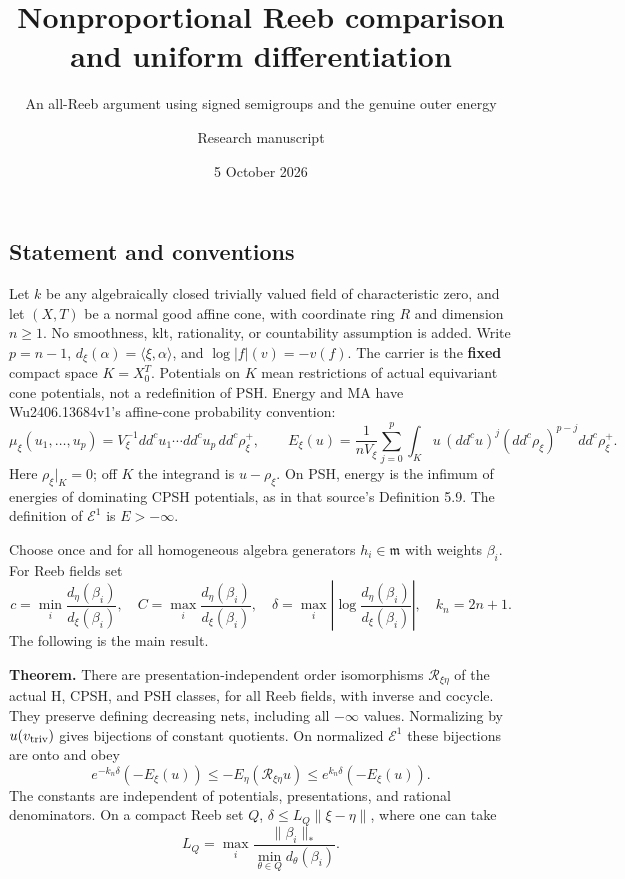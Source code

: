 \documentclass[
  10pt,
]{article}
\title{Nonproportional Reeb comparison and uniform differentiation}
\subtitle{An all-Reeb argument using signed semigroups and the genuine
outer energy}
\author{Research manuscript}
\date{5 October 2026}
\begin{document}
\maketitle

\subsection{Statement and conventions}\label{statement-and-conventions}

Let \(k\) be any algebraically closed trivially valued field of
characteristic zero, and let \((X,T)\) be a normal good affine cone,
with coordinate ring \(R\) and dimension \(n\geq1\). No smoothness, klt,
rationality, or countability assumption is added. Write \(p=n-1\),
\(d_\xi(\alpha)=\langle\xi,\alpha\rangle\), and \(\log|f|(v)=-v(f)\).
The carrier is the \textbf{fixed} compact space \(K=X_0^T\). Potentials
on \(K\) mean restrictions of actual equivariant cone potentials, not a
redefinition of PSH. Energy and MA have Wu2406.13684v1's affine-cone
probability convention: \[
 \mu_\xi(u_1,\ldots,u_p)=V_\xi^{-1}dd^cu_1\cdots dd^cu_p\,dd^c\rho_\xi^+,
 \qquad
 E_\xi(u)=\frac1{nV_\xi}\sum_{j=0}^p\int_Ku\,(dd^cu)^j(dd^c\rho_\xi)^{p-j}dd^c\rho_\xi^+ .       \tag{1}
\] Here \(\rho_\xi|_K=0\); off \(K\) the integrand is \(u-\rho_\xi\). On
PSH, energy is the infimum of energies of dominating CPSH potentials, as
in that source's Definition 5.9. The definition of \(\mathcal E^1\) is
\(E> -\infty\).

Choose once and for all homogeneous algebra generators
\(h_i\in\mathfrak m\) with weights \(\beta_i\). For Reeb fields set \[
 c=\min_i\frac{d_\eta(\beta_i)}{d_\xi(\beta_i)},\quad C=\max_i\frac{d_\eta(\beta_i)}{d_\xi(\beta_i)},\quad
 \delta=\max_i\left|\log\frac{d_\eta(\beta_i)}{d_\xi(\beta_i)}\right|,\quad k_n=2n+1.                     \tag{2}
\] The following is the main result.

\textbf{Theorem.} There are presentation-independent order isomorphisms
\(\mathcal R_{\xi\eta}\) of the actual H, CPSH, and PSH classes, for all
Reeb fields, with inverse and cocycle. They preserve defining decreasing
nets, including all \(-\infty\) values. Normalizing by
\(u(v_{\rm triv})\) gives bijections of constant quotients. On
normalized \(\mathcal E^1\) these bijections are onto and obey \[
 e^{-k_n\delta}(-E_\xi(u))\leq-E_\eta(\mathcal R_{\xi\eta}u)\leq e^{k_n\delta}(-E_\xi(u)).                  \tag{3}
\] The constants are independent of potentials, presentations, and
rational denominators. On a compact Reeb set \(Q\),
\(\delta\leq L_Q\|\xi-\eta\|\), where one can take
\[ L_Q=\max_i\frac{\|\beta_i\|_*}{\min_{\theta\in Q}d_\theta(\beta_i)}. \]
\end{document}
